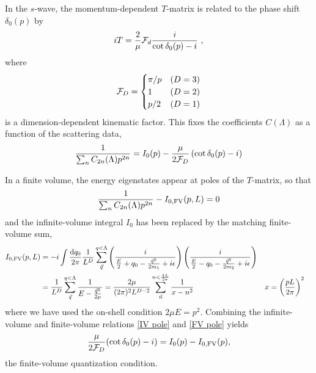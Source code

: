 In the $s$-wave, the momentum-dependent $T$-matrix is related to the phase shift $\delta_0(p)$ by
\begin{equation}\label{eq:cot delta}
    i T = \frac{2}{\mu}\mathcal{F}_d\frac{i}{\cot \delta_0(p)-i}\ ,
\end{equation}
where
\begin{equation}\label{eq:spherical FD}
    \mathcal{F}_D
    =
    \begin{cases}
        \pi/p   & (D=3)\\
        1       & (D=2)\\
        p/2     & (D=1)
\end{cases}
\end{equation}
is a dimension-dependent kinematic factor.
This fixes the coefficients $C(\Lambda)$ as a function of the scattering data,
\begin{equation}\label{eq:IV pole}
    \frac{1}{\sum_n C_{2n}(\Lambda) p^{2n}}
    =
    I_0(p) - \frac{\mu}{2 \mathcal{F}_D}\left(\cot \delta_0(p) - i\right)
\end{equation}

In a finite volume, the energy eigenstates appear at poles of the $T$-matrix, so that
\begin{equation}\label{eq:FV pole}
    \frac{1}{\sum_n C_{2n}(\Lambda) p^{2n}} - I_{0,\textrm{FV}}(p,L) = 0
\end{equation}
and the infinite-volume integral $I_0$ has been replaced by the matching finite-volume sum,
\begin{align}
I_{0,\textrm{FV}}(p,L)
    &=-i\int \frac { \mathrm {d}q_0}{2\pi} \frac{1}{L^D}\sum_{\vec{q}}^{q < \Lambda} \left( \frac { i } { \frac{E}{2} + q _ { 0 } - \frac{\vec{q}^2}{2m_1} + i \epsilon } \right) \left( \frac { i } { \frac{E}{2} - q _ { 0 } - \frac{\vec{q}^2}{2m_2} + i \epsilon } \right)
    \\
    &=\frac{1}{L^D}\sum_{\vec{q}}^{q < \Lambda} \frac { 1 } { E - \frac{\vec{q}^2}{2\mu} }
    =\frac{2\mu}{(2\pi)^2 L^{D-2}} \sum_{\vec{n}}^{n < \frac{\Lambda L}{2\pi}} \frac{1}{x-n^2}
    &
    x &= \left( \frac{pL}{2\pi}\right)^2
\end{align}
where we have used the on-shell condition $2\mu E=p^2$.  Combining the infinite-volume and finite-volume relations \eqref{IV pole} and \eqref{FV pole} yields
\begin{equation}
    \frac{\mu}{2\mathcal{F}_D}(\cot\delta_0(p)-i) = I_0(p) - I_{0,\textrm{FV}}(p),
\end{equation}
the finite-volume quantization condition.

